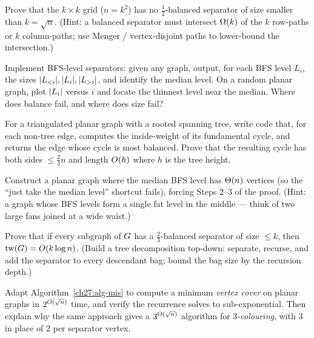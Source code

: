 \begin{exercise}\label{ch27:ex-gridlb}
Prove that the $k\times k$ grid ($n=k^2$) has no $\tfrac12$-balanced separator of size smaller than $k=\sqrt n$. (Hint: a balanced separator must intersect $\Omega(k)$ of the $k$ row-paths or $k$ column-paths; use Menger / vertex-disjoint paths to lower-bound the intersection.)
\end{exercise}

\begin{exercise}\label{ch27:ex-levels}
Implement BFS-level separators: given any graph, output, for each BFS level $L_i$, the sizes $\lvert L_{<i}\rvert,\lvert L_i\rvert,\lvert L_{>i}\rvert$, and identify the median level. On a random planar graph, plot $\lvert L_i\rvert$ versus $i$ and locate the thinnest level near the median. Where does balance fail, and where does size fail?
\end{exercise}

\begin{exercise}\label{ch27:ex-cycle}
For a triangulated planar graph with a rooted spanning tree, write code that, for each non-tree edge, computes the inside-weight of its fundamental cycle, and returns the edge whose cycle is most balanced. Prove that the resulting cycle has both sides $\le\tfrac23 n$ and length $O(h)$ where $h$ is the tree height.
\end{exercise}

\begin{exercise}\label{ch27:ex-break}
Construct a planar graph where the median BFS level has $\Theta(n)$ vertices (so the ``just take the median level'' shortcut fails), forcing Steps 2--3 of the proof. (Hint: a graph whose BFS levels form a single fat level in the middle --- think of two large fans joined at a wide waist.)
\end{exercise}

\begin{exercise}\label{ch27:ex-tw-sep}
Prove that if every subgraph of $G$ has a $\tfrac23$-balanced separator of size $\le k$, then $\operatorname{tw}(G)=O(k\log n)$. (Build a tree decomposition top-down: separate, recurse, and add the separator to every descendant bag; bound the bag size by the recursion depth.)
\end{exercise}

\begin{exercise}\label{ch27:ex-vc}
Adapt Algorithm~\ref{ch27:alg-mis} to compute a minimum \emph{vertex cover} on planar graphs in $2^{O(\sqrt n)}$ time, and verify the recurrence solves to sub-exponential. Then explain why the same approach gives a $3^{O(\sqrt n)}$ algorithm for \emph{$3$-colouring}, with $3$ in place of $2$ per separator vertex.
\end{exercise}

